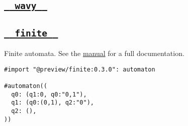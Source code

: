 \pandocbounded{}

\subsection{\texorpdfstring{\hyperref[wavy]{\texttt{\ }{\texttt{\ wavy\ }}\texttt{\ }}}{  wavy  }}\label{wavy}

\subsection{\texorpdfstring{\hyperref[finite]{\texttt{\ }{\texttt{\ finite\ }}\texttt{\ }}}{  finite  }}\label{finite}

Finite automata. See the
\href{https://github.com/jneug/typst-finite/blob/main/manual.pdf}{manual}
for a full documentation.

\begin{verbatim}
#import "@preview/finite:0.3.0": automaton

#automaton((
  q0: (q1:0, q0:"0,1"),
  q1: (q0:(0,1), q2:"0"),
  q2: (),
))
\end{verbatim}

\pandocbounded{}
